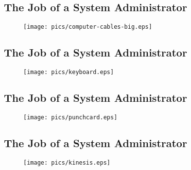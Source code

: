 \documentclass[xga]{xdvislides}
\begin{document}
\subsection{The Job of a System Administrator}
\vspace*{\fill}
\begin{figure}[hb]
	\begin{center}
		\texttt{[image: pics/computer-cables-big.eps]} \\
	\end{center}
\end{figure}
\vspace*{\fill}

\subsection{The Job of a System Administrator}
\vspace*{\fill}
\begin{figure}[hb]
	\begin{center}
		\texttt{[image: pics/keyboard.eps]} \\
	\end{center}
\end{figure}
\vspace*{\fill}

\subsection{The Job of a System Administrator}
\vspace*{\fill}
\begin{figure}[hb]
	\begin{center}
		\texttt{[image: pics/punchcard.eps]} \\
	\end{center}
\end{figure}
\vspace*{\fill}

\subsection{The Job of a System Administrator}
\vspace*{\fill}
\begin{figure}[hb]
	\begin{center}
		\texttt{[image: pics/kinesis.eps]} \\
	\end{center}
\end{figure}
\vspace*{\fill}
\end{document}
